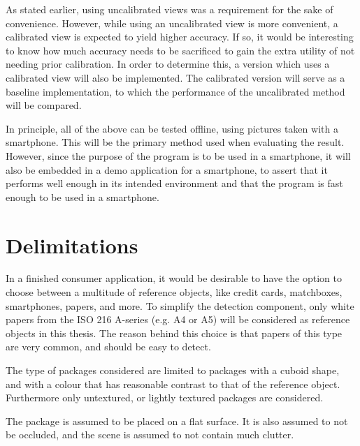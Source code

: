 As stated earlier, using uncalibrated views was a requirement for the sake of convenience.
However, while using an uncalibrated view is more convenient, a calibrated view is expected to yield higher accuracy.
If so, it would be interesting to know how much accuracy needs to be sacrificed to gain the extra utility of not needing prior calibration.
In order to determine this, a version which uses a calibrated view will also be implemented.
The calibrated version will serve as a baseline implementation, to which the performance of the uncalibrated method will be compared.

In principle, all of the above can be tested offline, using pictures taken with a smartphone.
This will be the primary method used when evaluating the result.
However, since the purpose of the program is to be used in a smartphone, it will also be embedded in a demo application for a smartphone, to assert that it performs well enough in its intended environment and that the program is fast enough to be used in a smartphone.

\section{Delimitations} \label{introduction:delimitations}
In a finished consumer application, it would be desirable to have the option to choose between a multitude of reference objects, like credit cards, matchboxes, smartphones, papers, and more. 
To simplify the detection component, only white papers from the ISO 216 A-series (e.g. A4 or A5) will be considered as reference objects in this thesis.
The reason behind this choice is that papers of this type are very common, and should be easy to detect.

The type of packages considered are limited to packages with a cuboid shape, and with a colour that has reasonable contrast to that of the reference object.
Furthermore only untextured, or lightly textured packages are considered.

The package is assumed to be placed on a flat surface.
It is also assumed to not be occluded, and the scene is assumed to not contain much clutter.